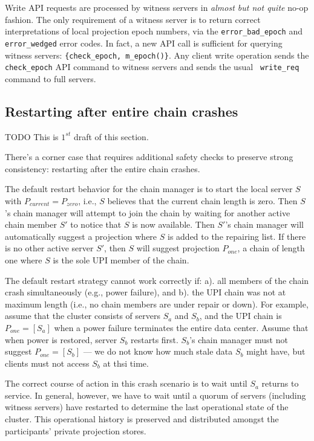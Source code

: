 \documentclass[preprint,10pt]{sigplanconf}
\begin{document}
Write API requests are processed by witness servers in {\em almost but
  not quite} no-op fashion.  The only requirement of a witness server
is to return correct interpretations of local projection epoch
numbers, via the {\tt error\_bad\_epoch} and {\tt error\_wedged} error
codes.  In fact, a new API call is sufficient for querying witness
servers: {\tt \{check\_epoch, m\_epoch()\}}.
Any client write operation sends the {\tt
  check\_\-epoch} API command to witness servers and sends the usual {\tt
  write\_\-req} command to full servers.

\subsection{Restarting after entire chain crashes}

TODO This is $1^{st}$ draft of this section.

There's a corner case that requires additional safety checks to
preserve strong consistency: restarting after the entire chain crashes.

The default restart behavior for the chain manager is to start the
local server $S$ with $P_{current} = P_{zero}$, i.e., $S$
believes that the current chain length is zero.  Then $S$'s chain
manager will attempt to join the chain by waiting for another active
chain member $S'$ to notice that $S$ is now available.  Then $S'$'s
chain manager will automatically suggest a projection where $S$ is
added to the repairing list.  If there is no other active server $S'$,
then $S$ will suggest projection $P_{one}$, a chain of length one
where $S$ is the sole UPI member of the chain.

The default restart strategy cannot work correctly if: a). all members
of the chain crash simultaneously (e.g., power failure), and b). the UPI
chain was not at maximum length (i.e., no chain members are under
repair or down).  For example, assume that the cluster consists of
servers $S_a$ and $S_b$, and the UPI chain is $P_{one} = [S_a]$ when a power
failure terminates the entire data center.  Assume that when power is
restored, server $S_b$ restarts first.  $S_b$'s chain manager must not
suggest $P_{one} = [S_b]$ --- we do not know how much stale data $S_b$
might have, but clients must not access $S_b$ at thsi time.

The correct course of action in this crash scenario is to wait until
$S_a$ returns to service.  In general, however, we have to wait until
a quorum of servers (including witness servers) have restarted to
determine the last operational state of the cluster.  This operational
history is preserved and distributed amongst the participants' private
projection stores.
\end{document}
